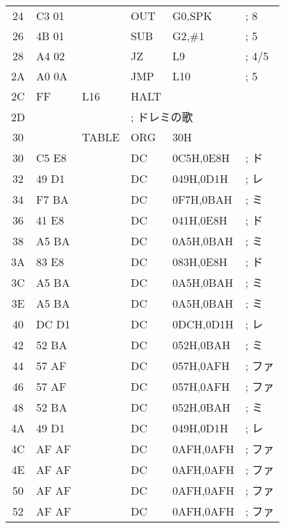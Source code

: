 \begin{figure}[btp]
{\begin{center}
\begin{tabular}{|c|l|l|l l l|}
24 & C3 01        &         & OUT    & G0,SPK      &   ; 8\\
26 & 4B 01        &         & SUB    & G2,\#1      &  ; 5\\
28 & A4 02        &         & JZ     & L9          &   ; 4/5\\
2A & A0 0A        &         & JMP    & L10         &   ; 5\\
2C & FF           &  L16    & HALT   &             &   \\
2D &              &         & \multicolumn{3}{|l|}{; ドレミの歌} \\
30 &              &  TABLE  & ORG    & 30H         &   \\
30 & C5 E8        &         & DC     & 0C5H,0E8H   &   ; ド\\
32 & 49 D1        &         & DC     & 049H,0D1H   &   ; レ\\
34 & F7 BA        &         & DC     & 0F7H,0BAH   &   ; ミ\\
36 & 41 E8        &         & DC     & 041H,0E8H   &   ; ド\\
38 & A5 BA        &         & DC     & 0A5H,0BAH   &   ; ミ\\
3A & 83 E8        &         & DC     & 083H,0E8H   &   ; ド\\
3C & A5 BA        &         & DC     & 0A5H,0BAH   &   ; ミ\\
3E & A5 BA        &         & DC     & 0A5H,0BAH   &   ; ミ\\
40 & DC D1        &         & DC     & 0DCH,0D1H   &   ; レ\\
42 & 52 BA        &         & DC     & 052H,0BAH   &   ; ミ\\
44 & 57 AF        &         & DC     & 057H,0AFH   &   ; ファ\\
46 & 57 AF        &         & DC     & 057H,0AFH   &   ; ファ\\
48 & 52 BA        &         & DC     & 052H,0BAH   &   ; ミ\\
4A & 49 D1        &         & DC     & 049H,0D1H   &   ; レ\\
4C & AF AF        &         & DC     & 0AFH,0AFH   &   ; ファ\\
4E & AF AF        &         & DC     & 0AFH,0AFH   &   ; ファ\\
50 & AF AF        &         & DC     & 0AFH,0AFH   &   ; ファ\\
52 & AF AF        &         & DC     & 0AFH,0AFH   &   ; ファ\\

\end{tabular}
\end{center}}
\end{figure}
